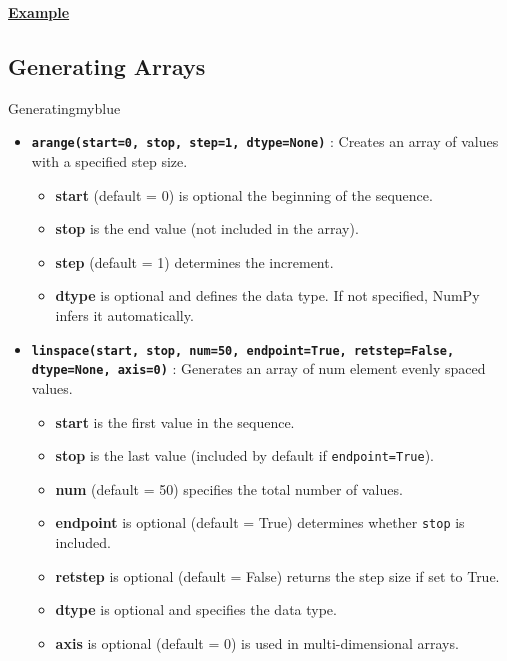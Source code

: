 \textbf{\underline{Example}}\\[0.1cm]



\subsection{Generating Arrays}
\begin{prettyBox}{Generating}{myblue}
\begin{itemize}
    \item \textbf{\texttt{arange(start=0, stop, step=1, dtype=None)}} : Creates an array of values 
    with a specified step size. 
    \begin{itemize}
        \item \textbf{start} (default = 0) is optional the beginning of the sequence.
        \item \textbf{stop} is the end value (not included in the array).
        \item \textbf{step} (default = 1) determines the increment.
        \item \textbf{dtype} is optional and defines the data type. If not specified, NumPy infers it automatically.
    \end{itemize}

    \item \textbf{\texttt{linspace(start, stop, num=50, endpoint=True, retstep=False, dtype=None, axis=0)}} : 
    Generates an array of num element evenly spaced values.
    \begin{itemize}
        \item \textbf{start} is the first value in the sequence.
        \item \textbf{stop} is the last value (included by default if \texttt{endpoint=True}).
        \item \textbf{num} (default = 50) specifies the total number of values.
        \item \textbf{endpoint} is optional (default = True) determines whether \texttt{stop} is included.
        \item \textbf{retstep} is optional (default = False) returns the step size if set to True.
        \item \textbf{dtype} is optional and specifies the data type.
        \item \textbf{axis} is optional (default = 0) is used in multi-dimensional arrays.
    \end{itemize}
\end{itemize}
\end{prettyBox}

